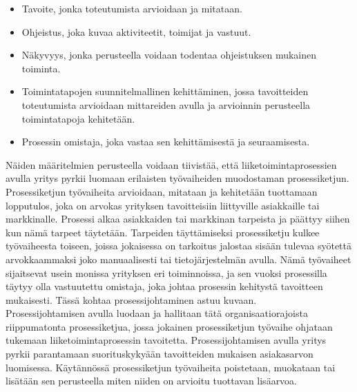 \documentclass[finnish,12pt,a4paper,pdftex]{article}
\begin{document}
\begin{itemize}
\setlength{\itemsep}{0pt}
    \item Tavoite, jonka toteutumista arvioidaan ja mitataan.
    \item Ohjeistus, joka kuvaa aktiviteetit, toimijat ja vastuut.
    \item Näkyvyys, jonka perusteella voidaan todentaa ohjeistuksen mukainen toiminta.
    \item Toimintatapojen suunnitelmallinen kehittäminen, jossa tavoitteiden toteutumista arvioidaan mittareiden avulla ja arvioinnin perusteella toimintatapoja kehitetään.
    \item Prosessin omistaja, joka vastaa sen kehittämisestä ja seuraamisesta.
\end{itemize}

Näiden määritelmien perusteella voidaan tiivistää, että liiketoimintaprosessien avulla yritys pyrkii luomaan erilaisten työvaiheiden muodostaman prosessiketjun. Prosessiketjun työvaiheita arvioidaan, mitataan ja kehitetään tuottamaan lopputulos, joka on arvokas yrityksen tavoitteisiin liittyville asiakkaille tai markkinalle. Prosessi alkaa asiakkaiden tai markkinan tarpeista ja päättyy siihen kun nämä tarpeet täytetään. Tarpeiden täyttämiseksi prosessiketju kulkee työvaiheesta toiseen, joissa jokaisessa on tarkoitus jalostaa sisään tulevaa syötettä arvokkaammaksi joko manuaalisesti tai tietojärjestelmän avulla. Nämä työvaiheet sijaitsevat usein monissa yrityksen eri toiminnoissa, ja sen vuoksi prosessilla täytyy olla vastuutettu omistaja, joka johtaa prosessin kehitystä tavoitteen mukaisesti. Tässä kohtaa prosessijohtaminen astuu kuvaan.  \\

Prosessijohtamisen avulla luodaan ja hallitaan tätä organisaatiorajoista riippumatonta prosessiketjua, jossa jokainen prosessiketjun työvaihe ohjataan tukemaan liiketoimintaprosessin tavoitetta. Prosessijohtamisen avulla yritys pyrkii parantamaan suorituskykyään tavoitteiden mukaisen asiakasarvon luomisessa. Käytännössä prosessiketjun työvaiheita poistetaan, muokataan tai lisätään sen perusteella miten niiden on arvioitu tuottavan lisäarvoa. \citep{ohjelmistotuotanto}\\
\end{document}
